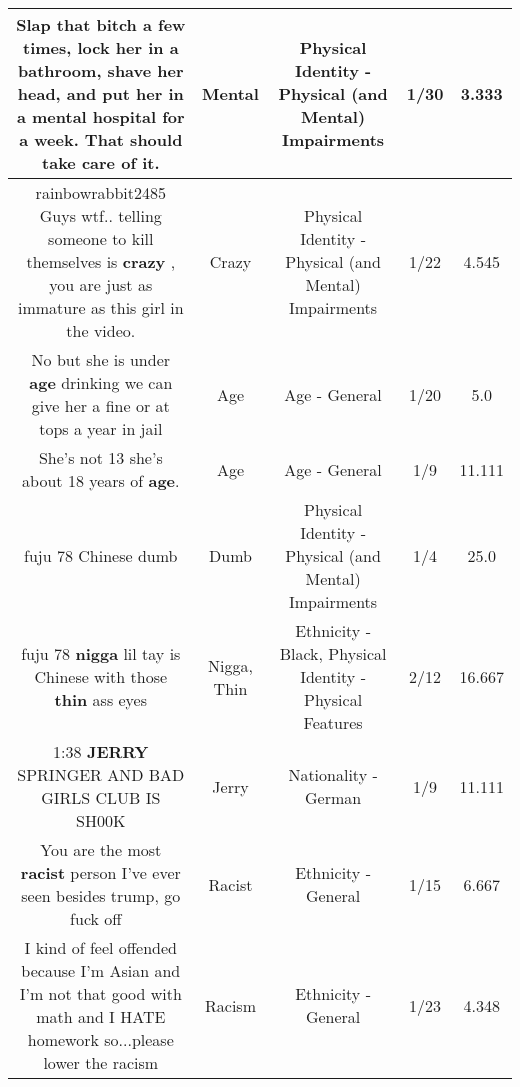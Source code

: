 \documentclass[11pt]{article}
\newlength\mylength
\begin{document}
\begin{center}
\begin{longtable}{|C{.65\mylength}|C{.30\mylength}|C{.12\mylength}|C{.12\mylength}|C{.12\mylength}|}
  \small Slap that bitch a few times, lock her in a bathroom, shave her head, and put her in a \textbf{mental} hospital for a week. That should take care of it.\normalsize   & Mental & Physical Identity - Physical (and Mental) Impairments & 1/30 & 3.333 \\  \hline
  \small rainbowrabbit2485 Guys wtf.. telling someone to kill themselves is \textbf{crazy} , you are just as immature as this girl in the video.\normalsize   & Crazy & Physical Identity - Physical (and Mental) Impairments & 1/22 & 4.545 \\  \hline
  \small No but she is under \textbf{age} drinking we can give her a fine or at tops a year in jail\normalsize   & Age & Age - General & 1/20 & 5.0 \\  \hline
  \small She's not 13 she's about 18 years of \textbf{age}.\normalsize   & Age & Age - General & 1/9 & 11.111 \\  \hline
  \small fuju 78 Chinese dumb\normalsize   & Dumb & Physical Identity - Physical (and Mental) Impairments & 1/4 & 25.0 \\  \hline
  \small fuju 78 \textbf{nigga} lil tay is Chinese with those \textbf{thin} ass eyes\normalsize   & Nigga, Thin & Ethnicity - Black, Physical Identity - Physical Features & 2/12 & 16.667 \\  \hline
  \small 1:38 \textbf{JERRY} SPRINGER AND BAD GIRLS CLUB IS SH00K\normalsize   & Jerry & Nationality - German & 1/9 & 11.111 \\  \hline
  \small You are the most \textbf{racist} person I've ever seen besides trump, go fuck off  🖕\normalsize   & Racist & Ethnicity - General & 1/15 & 6.667 \\  \hline
  \small I kind of feel offended because I'm Asian and I'm not that good with math and I HATE homework so...please lower the racism\normalsize   & Racism & Ethnicity - General & 1/23 & 4.348 \\  \hline

\end{longtable}
\end{center}
\end{document}
